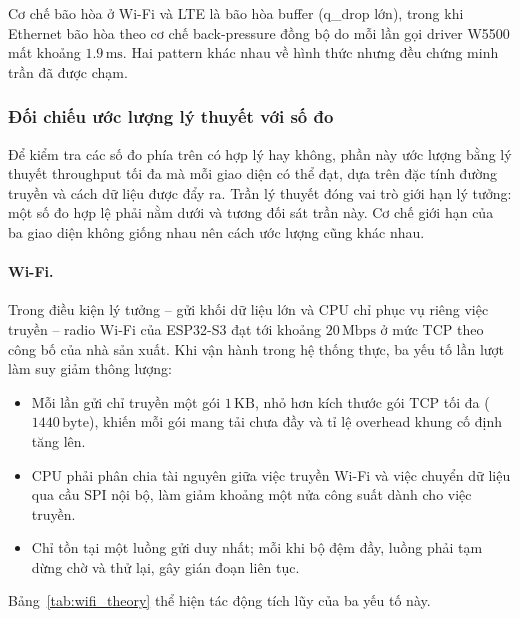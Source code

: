 Cơ chế bão hòa ở Wi-Fi và LTE là bão hòa buffer (q\_drop lớn), trong khi Ethernet bão hòa theo cơ chế back-pressure đồng bộ do mỗi lần gọi driver W5500 mất khoảng $1{.}9\,\text{ms}$. Hai pattern khác nhau về hình thức nhưng đều chứng minh trần đã được chạm.

\subsubsection{Đối chiếu ước lượng lý thuyết với số đo}

Để kiểm tra các số đo phía trên có hợp lý hay không, phần này ước lượng bằng lý thuyết throughput tối đa mà mỗi giao diện có thể đạt, dựa trên đặc tính đường truyền và cách dữ liệu được đẩy ra. Trần lý thuyết đóng vai trò giới hạn lý tưởng: một số đo hợp lệ phải nằm dưới và tương đối sát trần này. Cơ chế giới hạn của ba giao diện không giống nhau nên cách ước lượng cũng khác nhau.

\paragraph{Wi-Fi.}
Trong điều kiện lý tưởng -- gửi khối dữ liệu lớn và CPU chỉ phục vụ riêng việc truyền -- radio Wi-Fi của ESP32-S3 đạt tới khoảng $20\,\text{Mbps}$ ở mức TCP theo công bố của nhà sản xuất. Khi vận hành trong hệ thống thực, ba yếu tố lần lượt làm suy giảm thông lượng:
\begin{itemize}
    \item Mỗi lần gửi chỉ truyền một gói $1\,\text{KB}$, nhỏ hơn kích thước gói TCP tối đa ($1440\,\text{byte}$), khiến mỗi gói mang tải chưa đầy và tỉ lệ overhead khung cố định tăng lên.
    \item CPU phải phân chia tài nguyên giữa việc truyền Wi-Fi và việc chuyển dữ liệu qua cầu SPI nội bộ, làm giảm khoảng một nửa công suất dành cho việc truyền.
    \item Chỉ tồn tại một luồng gửi duy nhất; mỗi khi bộ đệm đầy, luồng phải tạm dừng chờ và thử lại, gây gián đoạn liên tục.
\end{itemize}
Bảng~\ref{tab:wifi_theory} thể hiện tác động tích lũy của ba yếu tố này.

